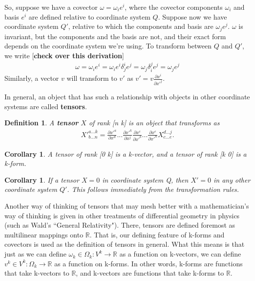 \documentclass{book}
\newtheorem{defn}[equation]{Definition}
\newtheorem{coro}[equation]{Corollary}
\begin{document}
So, suppose we have a covector $\omega = \omega_i e^i$, where the covector components $\omega_i$ and basis $e^i$ are defined relative to coordinate system $Q$. Suppose now we have coordinate system $Q'$, relative to which the components and basis are $\omega_je^j$. $\omega$ is invariant, but the components and the basis are not, and their exact form depends on the coordinate system we're using. To transform between $Q$ and $Q'$, we write [\textbf{check over this derivation}]\begin{gather}\omega = \omega_i e^i = \omega_i e^i \delta_j^i e^j = \omega_j \delta^j_i e^j= \omega_j e^j \end{gather} Similarly, a vector $v$ will transform to $v'$ as $v' = v \frac{\partial x^i}{\partial x'^j}$. 



In general, an object that has such a relationship with objects in other coordinate systems are called \textbf{tensors}. 



\begin{defn}
	A \textbf{tensor} $X$ of rank [n k] is an object that transforms as \begin{gather}X'^{a...k}_{b...n} = \frac{\partial x'^a}{\partial x^d} ... \frac{\partial x'^k}{\partial x^j} \frac{\partial x^c}{\partial x'^b} ... \frac{\partial x^e}{\partial x'^n} X^{d...j}_{c...e}.\end{gather} 
\end{defn}

\begin{coro}
	A tensor of rank [0 k] is a k-vector, and a tensor of rank [k 0] is a k-form. 
\end{coro}



\begin{coro}
	If a tensor $X = 0$ in coordinate system Q, then $X' = 0$ in any other coordinate system $Q'$. This follows immediately from the transformation rules. 
\end{coro}


Another way of thinking of tensors that may mesh better with a mathematician's way of thinking is given in other treatments of differential geometry in physics (such as Wald's ``General Relativity"). There, tensors are defined foremost as multilinear mappings onto $\mathbb{R}$. That is, our defining feature of k-forms and covectors is used as the definition of tensors in general. What this means is that just as we can define $\omega_k \in \Omega_k : V^k \to \mathbb{R}$ as a function on k-vectors, we can define $v^k \in V^k : \Omega_k \to \mathbb{R}$ as a function on k-forms. In other words, k-forms are functions that take k-vectors to $\mathbb{R}$, and k-vectors are functions that take k-forms to $\mathbb{R}$. 
\end{document}
